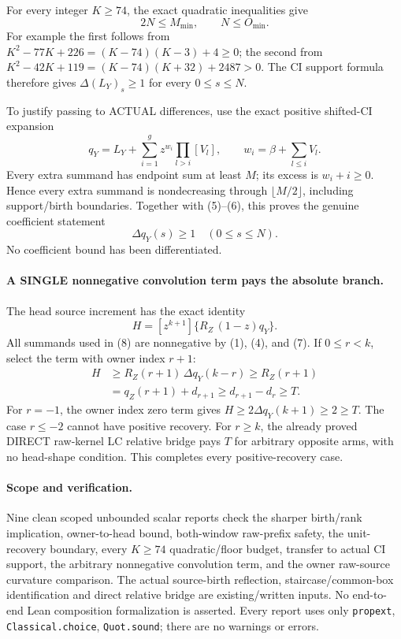 For every integer $K\ge74$, the exact quadratic inequalities give
\[
                              2N\le M_{\min},\qquad N\le O_{\min}.
                                                               \tag{6}
\]
For example the first follows from
$K^2-77K+226=(K-74)(K-3)+4\ge0$; the second from
$K^2-42K+119=(K-74)(K+32)+2487>0$.
The CI support formula therefore gives
$\Delta(L_Y)_s\ge1$ for every $0\le s\le N$.

To justify passing to ACTUAL differences, use the exact positive
shifted-CI expansion
\[
 q_Y=L_Y+\sum_{i=1}^{g}z^{w_i}\prod_{l>i}[V_l],
 \qquad w_i=\beta+\sum_{l\le i}V_l.
\]
Every extra summand has endpoint sum at least $M$; its excess is
$w_i+i\ge0$.  Hence every extra summand is nondecreasing through
$\lfloor M/2\rfloor$, including support/birth boundaries.
Together with (5)--(6), this proves the genuine coefficient statement
\[
                        \Delta q_Y(s)\ge1
                               \quad(0\le s\le N).    \tag{7}
\]
No coefficient bound has been differentiated.

\paragraph{A SINGLE nonnegative convolution term pays the absolute branch.}
The head source increment has the exact identity
\[
            H=[z^{k+1}]\{R_Z\,(1-z)q_Y\}.            \tag{8}
\]
All summands used in (8) are nonnegative by (1), (4), and (7).
If $0\le r<k$, select the term with owner index $r+1$:
\[
 \begin{split}
 H&\ge R_Z(r+1)\,\Delta q_Y(k-r)
      \ge R_Z(r+1)\\
  &=q_Z(r+1)+d_{r+1}\ge d_{r+1}-d_r\ge T.
 \end{split}                                           \tag{9}
\]
For $r=-1$, the owner index zero term gives
$H\ge2\Delta q_Y(k+1)\ge2\ge T$.
The case $r\le-2$ cannot have positive recovery.
For $r\ge k$, the already proved DIRECT raw-kernel LC relative
bridge pays $T$ for arbitrary opposite arms, with no head-shape
condition.  This completes every positive-recovery case.

\paragraph{Scope and verification.}
Nine clean scoped unbounded scalar reports check the sharper birth/rank implication,
owner-to-head bound, both-window raw-prefix safety, the unit-recovery
boundary, every $K\ge74$ quadratic/floor budget, transfer to actual
CI support, the arbitrary nonnegative convolution term, and the
owner raw-source curvature comparison.  The actual source-birth
reflection, staircase/common-box identification and direct relative
bridge are existing/written inputs.  No end-to-end Lean composition
formalization is asserted.
Every report uses only \texttt{propext}, \texttt{Classical.choice},
\texttt{Quot.sound}; there are no warnings or errors.

